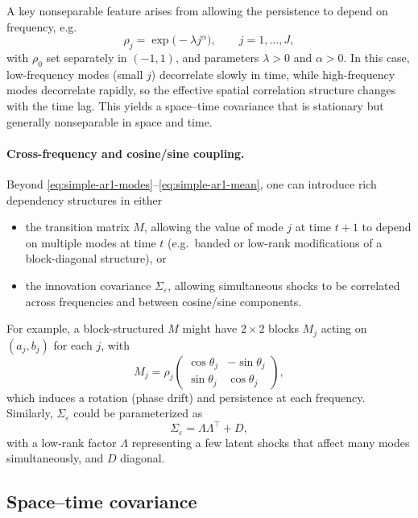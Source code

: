 \documentclass[answers,12pt,addpoints]{exam}
\begin{document}
A key nonseparable feature arises from allowing the persistence to depend on frequency, e.g.
\begin{equation}
  \rho_j
  =
  \exp\bigl(-\lambda j^\alpha\bigr),
  \qquad j=1,\dots,J,
  \label{eq:rho-freq-dependence}
\end{equation}
with $\rho_0$ set separately in $(-1,1)$, and parameters $\lambda > 0$ and $\alpha > 0$. In this case, low-frequency modes (small $j$) decorrelate slowly in time, while high-frequency modes decorrelate rapidly, so the effective spatial correlation structure changes with the time lag. This yields a space--time covariance that is stationary but generally nonseparable in space and time.

\paragraph{Cross-frequency and cosine/sine coupling.}  
Beyond \eqref{eq:simple-ar1-modes}--\eqref{eq:simple-ar1-mean}, one can introduce rich dependency structures in either
\begin{itemize}
  \item the transition matrix $M$, allowing the value of mode $j$ at time $t+1$ to depend on multiple modes at time $t$ (e.g.\ banded or low-rank modifications of a block-diagonal structure), or
  \item the innovation covariance $\Sigma_\varepsilon$, allowing simultaneous shocks to be correlated across frequencies and between cosine/sine components.
\end{itemize}
For example, a block-structured $M$ might have $2\times 2$ blocks $M_j$ acting on $(a_j,b_j)$ for each $j$, with
\[
  M_j
  =
  \rho_j
  \begin{pmatrix}
    \cos\theta_j & -\sin\theta_j \\
    \sin\theta_j & \cos\theta_j
  \end{pmatrix},
\]
which induces a rotation (phase drift) and persistence at each frequency. Similarly, $\Sigma_\varepsilon$ could be parameterized as
\[
  \Sigma_\varepsilon = \Lambda \Lambda^\top + D,
\]
with a low-rank factor $\Lambda$ representing a few latent shocks that affect many modes simultaneously, and $D$ diagonal.

\subsection{Space--time covariance}
\end{document}
